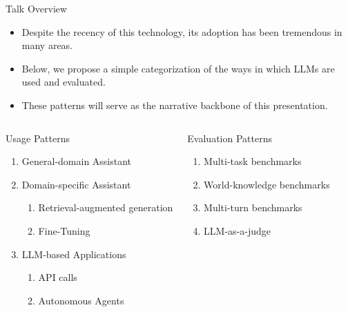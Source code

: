 \documentclass[handout]{beamer}
\begin{document}
\begin{frame}{Talk Overview}
\begin{scriptsize}
\begin{itemize}
 \item Despite the recency of this technology, its adoption has been tremendous in many areas. 
 \item Below, we propose a simple categorization of the ways in which LLMs are used and evaluated.
  \item These patterns will serve as the narrative backbone of this presentation.
\end{itemize}



\begin{columns}[t]
\begin{block}{Usage Patterns}
\begin{enumerate}
\item General-domain Assistant
\item Domain-specific Assistant
\begin{enumerate}\scriptsize
\item Retrieval-augmented generation
\item Fine-Tuning
\end{enumerate}
\item LLM-based Applications
\begin{enumerate}\scriptsize
\item API calls
\item Autonomous Agents
\end{enumerate}
\end{enumerate}
\end{block}

\begin{block}{Evaluation Patterns}
\begin{enumerate}
\item Multi-task benchmarks
\item World-knowledge benchmarks
\item Multi-turn benchmarks
\item LLM-as-a-judge
\end{enumerate}
\end{block}

\end{columns}

\end{scriptsize}
\end{frame}
\end{document}
